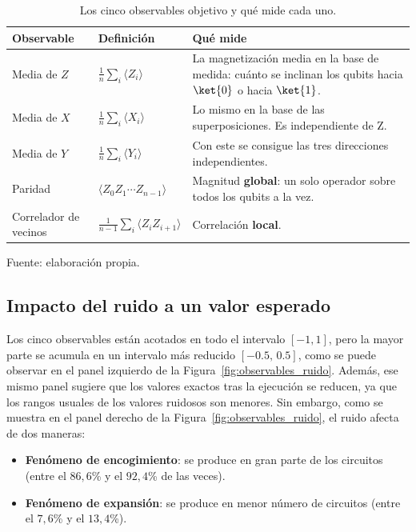 \begin{table}[htbp]
    \centering
    \caption{Los cinco observables objetivo y qué mide cada uno.}
    \label{tab:observables}
    {\footnotesize
    \begin{tabular}{@{}llp{}@{}}
        \toprule
        \textbf{Observable} & \textbf{Definición} & \textbf{Qué mide} \\
        \midrule
        Media de $Z$ & $\frac{1}{n}\sum_{i} \langle Z_i \rangle$
            & La magnetización media en la base de medida: cuánto se inclinan los qubits
              hacia $\ket{0}$ o hacia $\ket{1}$. \\
        Media de $X$ & $\frac{1}{n}\sum_{i} \langle X_i \rangle$
            & Lo mismo en la base de las superposiciones. Es independiente de Z.\\
        Media de $Y$ & $\frac{1}{n}\sum_{i} \langle Y_i \rangle$
            & Con este se consigue las tres direcciones independientes. \\
        Paridad & $\langle Z_0 Z_1 \cdots Z_{n-1} \rangle$
            & Magnitud \textbf{global}: un solo operador sobre todos los qubits a la vez. \\
        Correlador de vecinos & $\frac{1}{n-1}\sum_{i} \langle Z_i Z_{i+1} \rangle$
            & Correlación \textbf{local}. \\
        \bottomrule
    \end{tabular}}

    {\footnotesize Fuente: elaboración propia.}
\end{table}

\subsection{Impacto del ruido a un valor esperado}
\label{sec:ruido_observable}

Los cinco observables están acotados en todo el intervalo $[-1,1]$, pero la mayor parte se acumula en un intervalo más reducido $[-0.5,\, 0.5]$, como se puede observar en el panel izquierdo de la Figura~\ref{fig:observables_ruido}. Además, ese mismo panel sugiere que los valores exactos tras la ejecución se reducen, ya que los rangos usuales de los valores ruidosos son menores. Sin embargo, como se muestra en el panel derecho de la Figura~\ref{fig:observables_ruido}, el ruido afecta de dos maneras:
\begin{itemize}
    \item \textbf{Fenómeno de encogimiento}: se produce en gran parte de los circuitos (entre el $86{,}6$\% y el $92{,}4$\% de las veces).
    \item \textbf{Fenómeno de expansión}: se produce en menor número de circuitos (entre el $7{,}6$\% y el $13{,}4$\%).
\end{itemize}

